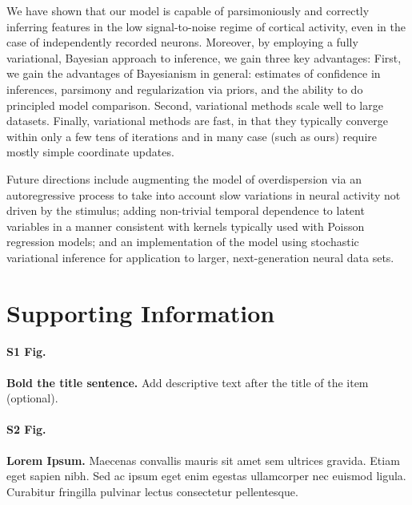 \documentclass[10pt,letterpaper]{article}
\begin{document}
We have shown that our model is capable of parsimoniously and correctly inferring features in the low signal-to-noise regime of cortical activity, even in the case of independently recorded neurons. Moreover, by employing a fully variational, Bayesian approach to inference, we gain three key advantages: First, we gain the advantages of Bayesianism in general: estimates of confidence in inferences, parsimony and regularization via priors, and the ability to do principled model comparison. Second, variational methods scale well to large datasets. Finally, variational methods are fast, in that they typically converge within only a few tens of iterations and in many case (such as ours) require mostly simple coordinate updates. %

Future directions include augmenting the model of overdispersion via an autoregressive process to take into account slow variations in neural activity not driven by the stimulus; adding non-trivial temporal dependence to latent variables in a manner consistent with kernels typically used with Poisson regression models; and an implementation of the model using stochastic variational inference for application to larger, next-generation neural data sets.




\section*{Supporting Information}

\paragraph*{S1 Fig.}
\label{S1_Fig}
{\bf Bold the title sentence.} Add descriptive text after the title of the item (optional).

\paragraph*{S2 Fig.}
\label{S2_Fig}
{\bf Lorem Ipsum.} Maecenas convallis mauris sit amet sem ultrices gravida. Etiam eget sapien nibh. Sed ac ipsum eget enim egestas ullamcorper nec euismod ligula. Curabitur fringilla pulvinar lectus consectetur pellentesque.
\end{document}
